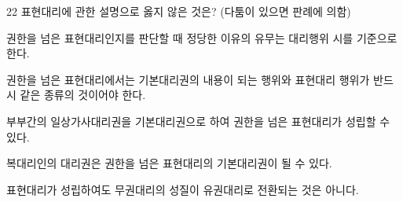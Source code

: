 \begin{question}{22}
표현대리에 관한 설명으로 옳지 않은 것은? (다툼이 있으면 판례에 의함)
\begin{choices}
  \item 권한을 넘은 표현대리인지를 판단할 때 정당한 이유의 유무는 대리행위 시를 기준으로 한다.
  \item 권한을 넘은 표현대리에서는 기본대리권의 내용이 되는 행위와 표현대리 행위가 반드시 같은 종류의 것이어야 한다.
  \item 부부간의 일상가사대리권을 기본대리권으로 하여 권한을 넘은 표현대리가 성립할 수 있다.
  \item 복대리인의 대리권은 권한을 넘은 표현대리의 기본대리권이 될 수 있다.
  \item 표현대리가 성립하여도 무권대리의 성질이 유권대리로 전환되는 것은 아니다.
\end{choices}
\end{question}
